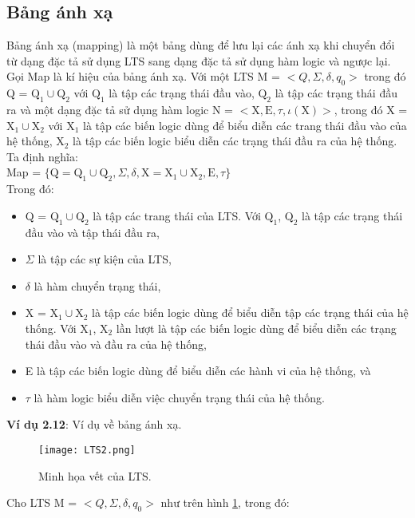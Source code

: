 \documentclass[a4paper,13pt,oneside,openany]{book}
\begin{document}
\begin{flushleft}
		\section{Bảng ánh xạ}
		Bảng ánh xạ (mapping) là một bảng dùng để lưu lại các ánh xạ khi chuyển đổi từ dạng đặc tả sử dụng LTS sang dạng đặc tả sử dụng hàm logic và ngược lại.\\
		Gọi Map là kí hiệu của bảng ánh xạ. Với một LTS M = $<Q, \Sigma, \delta, q_{0}>$ trong đó Q = $\textrm{Q}_1 \cup \textrm{Q}_2$ với $\textrm{Q}_1$ là tập các trạng thái đầu vào, $\textrm{Q}_2$ là tập các trạng thái đầu ra và một dạng đặc tả sử dụng hàm logic N = $<\textrm{X}, \textrm{E}, \tau, \iota(\textrm{X})>$, trong đó X = $\textrm{X}_1 \cup \textrm{X}_2$ với $\textrm{X}_1$ là tập các biến logic dùng để biểu diễn các trang thái đầu vào của hệ thống, $\textrm{X}_2$ là tập các biến logic biểu diễn các trạng thái đầu ra của hệ thống. Ta định nghĩa:\\
		Map = $\{\textrm{Q} = \textrm{Q}_1 \cup \textrm{Q}_2, \Sigma, \delta, \textrm{X} = \textrm{X}_1 \cup \textrm{X}_2, \textrm{E}, \tau\}$\\
		Trong đó:\\
		\begin{itemize}
			\item Q = $\textrm{Q}_1 \cup \textrm{Q}_2$ là tập các trang thái của LTS. Với $\textrm{Q}_1$, $\textrm{Q}_2$ là tập các trạng thái đầu vào và tập thái đầu ra,
			\item $\Sigma$ là tập các sự kiện của LTS,
			\item $\delta$ là hàm chuyển trạng thái,
			\item X = $\textrm{X}_1 \cup \textrm{X}_2$ là tập các biến logic dùng để biểu diễn tập các trạng thái của hệ thống. Với $\textrm{X}_1$, $\textrm{X}_2$ lần lượt là tập các biến logic dùng để biểu diễn các trạng thái đầu vào và đầu ra của hệ thống,
			\item E là tập các biến logic dùng để biểu diễn các hành vi của hệ thống, và
			\item $\tau$ là hàm logic biểu diễn việc chuyển trạng thái của hệ thống.
		\end{itemize}
		\textbf{Ví dụ 2.12}: Ví dụ về bảng ánh xạ.\\
		\begin{figure}[h]
			\centering
			\texttt{[image: LTS2.png]}
			\caption{Minh họa vết của LTS.}
			\label{fig:LTS3}
		\end{figure}
		Cho LTS M = $<Q, \Sigma, \delta, q_{0}>$ như trên hình \ref{fig:LTS3}, trong đó:

\end{flushleft}
\end{document}
